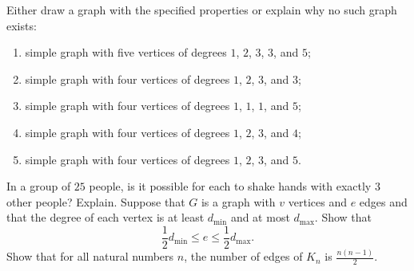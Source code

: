 \begin{chapterendexercises}
  \exercise Either draw a graph with the specified properties or explain why
    no such graph exists:
    \begin{enumerate}[nolistsep]
      \item simple graph with five vertices of degrees $1$, $2$, $3$, $3$,
        and $5$;
      \item simple graph with four vertices of degrees $1$, $2$, $3$, and $3$;
      \item simple graph with four vertices of degrees $1$, $1$, $1$, and $5$;
      \item simple graph with four vertices of degrees $1$, $2$, $3$, and $4$;
      \item simple graph with four vertices of degrees $1$, $2$, $3$, and $5$.
    \end{enumerate}
  \exercise In a group of $25$ people, is it possible for each to shake hands
    with exactly $3$ other people? Explain.
  \exercise Suppose that $G$ is a graph with $v$ vertices and $e$ edges and
    that the degree of each vertex is at least $d_\mathrm{min}$ and at most
    $d_\mathrm{max}$. Show that
    \[
      \frac{1}{2} d_\mathrm{min} \le e \le \frac{1}{2} d_\mathrm{max}.
    \]
  \exercise Show that for all natural numbers $n$, the number of edges of $K_n$
    is $\frac{n(n - 1)}{2}$.
\end{chapterendexercises}

